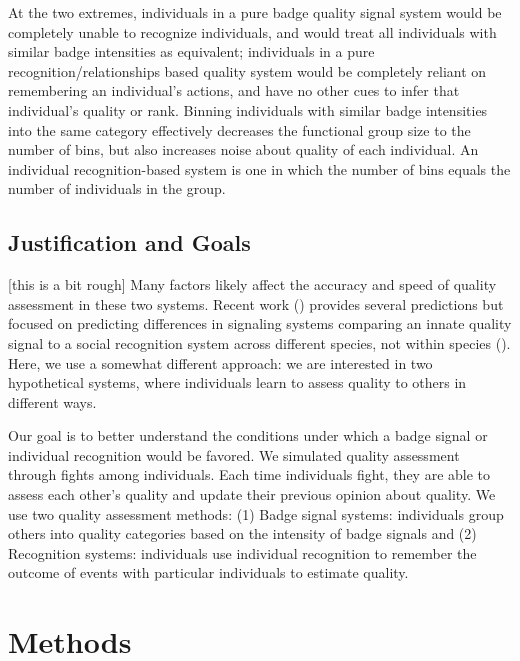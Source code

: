At the two extremes, individuals in a pure badge quality signal system would be completely unable to recognize individuals, and would treat all individuals with similar badge intensities as equivalent; individuals in a pure recognition/relationships based quality system would be completely reliant on remembering an individual's actions, and have no other cues to infer that individual's quality or rank. Binning individuals with similar badge intensities into the same category effectively decreases the functional group size to the number of bins, but also increases noise about quality of each individual. An individual recognition-based system is one in which the number of bins equals the number of individuals in the group.  

\subsection*{Justification and Goals}

[this is a bit rough] Many factors likely affect the accuracy and speed of quality assessment in these two systems. Recent work (\cite{sheehan2016evotradeoff}) provides several predictions but focused on predicting differences in signaling systems comparing an innate quality signal to a social recognition system across different species, not within species (\cite{sheehan2016response}). Here, we use a somewhat different approach: we are interested in two hypothetical systems, where individuals learn to assess quality to others in different ways. 

Our goal is to better understand the conditions under which a badge signal or individual recognition would be favored. We simulated quality assessment through fights among individuals. Each time individuals fight, they are able to assess each other's quality and update their previous opinion about quality. We use two quality assessment methods: (1) Badge signal systems: individuals group others into quality categories based on the intensity of badge signals and (2) Recognition systems: individuals use individual recognition to remember the outcome of events with particular individuals to estimate quality. 

\section*{Methods} 
%
